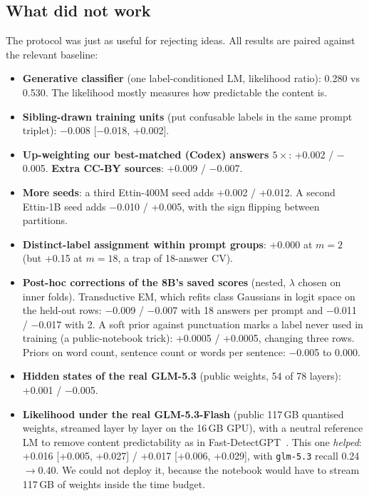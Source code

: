 \documentclass[10pt,twocolumn,letterpaper]{article}
\begin{document}
\subsection{What did not work}
\label{sec:negative}
The protocol was just as useful for rejecting ideas. All results are paired against the relevant baseline:
\begin{itemize}
\item \textbf{Generative classifier} (one label-conditioned LM, likelihood ratio): 0.280 vs 0.530. The likelihood mostly measures how predictable the content is.
\item \textbf{Sibling-drawn training units} (put confusable labels in the same prompt triplet): $-$0.008 [$-$0.018, +0.002].
\item \textbf{Up-weighting our best-matched (Codex) answers $5\times$}: +0.002 / $-$0.005. \textbf{Extra CC-BY sources}: +0.009 / $-$0.007.
\item \textbf{More seeds}: a third Ettin-400M seed adds +0.002 / +0.012. A second Ettin-1B seed adds $-$0.010 / +0.005, with the sign flipping between partitions.
\item \textbf{Distinct-label assignment within prompt groups}: +0.000 at $m=2$ (but +0.15 at $m=18$, a trap of 18-answer CV).
\item \textbf{Post-hoc corrections of the 8B's saved scores} (nested, $\lambda$ chosen on inner folds). Transductive EM, which refits class Gaussians in logit space on the held-out rows: $-$0.009 / $-$0.007 with 18 answers per prompt and $-$0.011 / $-$0.017 with 2. A soft prior against punctuation marks a label never used in training (a public-notebook trick): +0.0005 / +0.0005, changing three rows. Priors on word count, sentence count or words per sentence: $-$0.005 to 0.000.
\item \textbf{Hidden states of the real GLM-5.3} (public weights, 54 of 78 layers): +0.001 / $-$0.005.
\item \textbf{Likelihood under the real GLM-5.3-Flash} (public 117\,GB quantised weights, streamed layer by layer on the 16\,GB GPU), with a neutral reference LM to remove content predictability as in Fast-DetectGPT~\cite{bao2024fastdetectgpt}. This one \emph{helped}: +0.016 [+0.005, +0.027] / +0.017 [+0.006, +0.029], with \texttt{glm-5.3} recall 0.24$\to$0.40. We could not deploy it, because the notebook would have to stream 117\,GB of weights inside the time budget.
\end{itemize}

\end{document}
